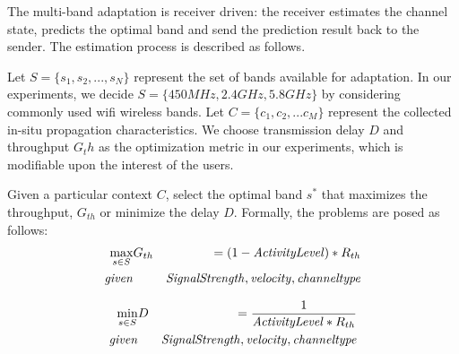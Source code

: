 The multi-band adaptation is receiver driven: the receiver
estimates the channel state, predicts the optimal band and send the 
prediction result back to the sender. The estimation process is 
described as follows.

Let $S = \{s_1, s_2, ..., s_N\}$ represent the set of bands 
available for adaptation. In our experiments, we decide $S = \{450 MHz, 
2.4 GHz, 5.8 GHz\}$ by considering commonly used wifi wireless bands.  
Let $C = \{c_1, c_2, ...c_M\}$ represent the collected in-situ propagation 
characteristics. We choose transmission delay $D$ and throughput $G_th$ as 
the optimization metric in our experiments, which is modifiable upon the 
interest of the users. 

Given a particular context $C$, select the optimal band $s^*$ that 
maximizes the throughput, $G_{th}$ or minimize the delay $D$.
Formally, the problems are posed as follows:
\begin{eqnarray}
\max_{s \in S}& G_{th}& = (1-\mbox{\it Activity Level})*R_{th} \label{eq:throughput_optimization} \\
		\mbox{\it given} & & \mbox{\it Signal Strength}, \mbox{\it velocity}, \mbox{\it channel type} \nonumber
		\end{eqnarray}

\begin{eqnarray}
\min_{s \in S}& D& = \frac1{\mbox{\it Activity Level}*R_{th}}\label{eq:delay_optimization} \\
		\mbox{\it given} & & \mbox{\it Signal Strength}, \mbox{\it velocity}, \mbox{\it channel type} \nonumber
		\end{eqnarray}
		








